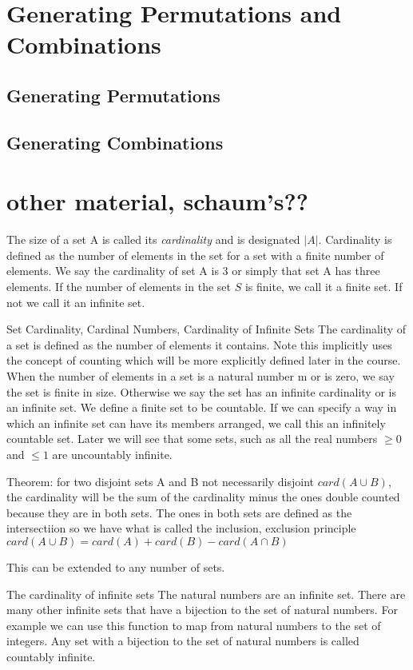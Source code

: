 \section {Generating Permutations and Combinations}
    \subsection {Generating Permutations}
    \subsection {Generating Combinations}





\section{other material, schaum's??}
The size of a set A is called its \textit{cardinality} and is designated $|A|$. Cardinality is defined as the number of elements in the set for a set with a finite number of elements. We say the cardinality of set A is 3 or simply that set A has three elements. If the number of elements in the set $S$ is finite, we call it a finite set. If not we call it an infinite set.

Set Cardinality, Cardinal Numbers, Cardinality of Infinite Sets
The cardinality of a set is defined as the number of elements it contains. Note this implicitly uses the concept of counting which will be more explicitly defined later in the course. When the number of elements in a set is a natural number m or is zero, we say the set is finite in size. Otherwise we say the set has an infinite cardinality or is an infinite set. We define a finite set to be countable. If we can specify a way in which an infinite set can have its members arranged, we call this an infinitely countable set. Later we will see that some sets, such as all the real numbers $\ge 0$ and $\le 1$ are uncountably infinite. 


Theorem: for two disjoint sets A and B not necessarily disjoint
$card(A \cup B)$, the cardinality will be the sum of the cardinality minus the ones double counted because they are in both sets. The ones in both sets are defined as the intersectiion so we have what is called the inclusion, exclusion principle
$card(A \cup B) = card(A) + card(B) - card(A \cap B)$

This can be extended to any number of sets.

The cardinality of infinite sets
The natural numbers are an infinite set. There are many other infinite sets that have a bijection to the set of natural numbers. For example we can use this function to map from natural numbers to the set of integers.  Any set with a bijection to the set of natural numbers is called countably infinite.

